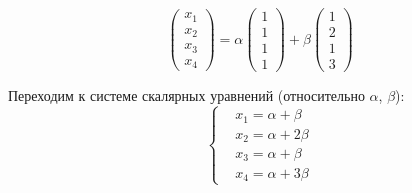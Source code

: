 \documentclass[a4paper,12pt]{article}
\begin{document}
  \begin{solution}
    \[
      \begin{pmatrix}
        x_1 \\ x_2 \\ x_3 \\ x_4
      \end{pmatrix} = \alpha \begin{pmatrix}
        1 \\ 1 \\ 1 \\ 1
      \end{pmatrix} + \beta \begin{pmatrix}
        1 \\ 2 \\ 1 \\ 3
      \end{pmatrix}
    \]
    
    Переходим к системе скалярных уравнений (относительно $\alpha$, $\beta$):
    \begin{equation}\label{p-20-23-system}
      \left\{
        \begin{aligned}
          &x_1 = \alpha + \beta\\
          &x_2 = \alpha + 2\beta\\
          &x_3 = \alpha + \beta\\
          &x_4 = \alpha + 3\beta
        \end{aligned}
      \right.
    \end{equation}
    

\end{solution}
\end{document}
